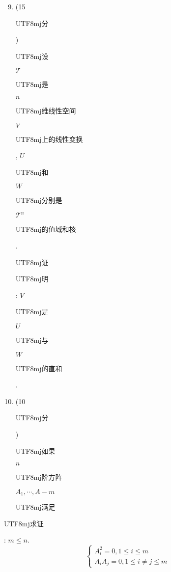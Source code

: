 \documentclass[10pt]{article}
\begin{document}
\begin{enumerate}
  \setcounter{enumi}{8}
  \item (15 \begin{CJK}{UTF8}{mj}分\end{CJK}) \begin{CJK}{UTF8}{mj}设\end{CJK} $\mathscr{T}$ \begin{CJK}{UTF8}{mj}是\end{CJK} $n$ \begin{CJK}{UTF8}{mj}维线性空间\end{CJK} $V$ \begin{CJK}{UTF8}{mj}上的线性变换\end{CJK}, $U$ \begin{CJK}{UTF8}{mj}和\end{CJK} $W$ \begin{CJK}{UTF8}{mj}分别是\end{CJK} $\mathscr{T}^{n}$ \begin{CJK}{UTF8}{mj}的值域和核\end{CJK}. \begin{CJK}{UTF8}{mj}证\end{CJK} \begin{CJK}{UTF8}{mj}明\end{CJK}: $V$ \begin{CJK}{UTF8}{mj}是\end{CJK} $U$ \begin{CJK}{UTF8}{mj}与\end{CJK} $W$ \begin{CJK}{UTF8}{mj}的直和\end{CJK}.

  \item (10 \begin{CJK}{UTF8}{mj}分\end{CJK}) \begin{CJK}{UTF8}{mj}如果\end{CJK} $n$ \begin{CJK}{UTF8}{mj}阶方阵\end{CJK} $A_{1}, \cdots, A-m$ \begin{CJK}{UTF8}{mj}满足\end{CJK}

\end{enumerate}
\begin{CJK}{UTF8}{mj}求证\end{CJK}: $m \leqslant n$.
$$
\left\{\begin{array}{l}
A_{i}^{2}=0,1 \leq i \leq m \\
A_{i} A_{j}=0,1 \leq i \neq j \leq m
\end{array}\right.
$$
\end{document}
